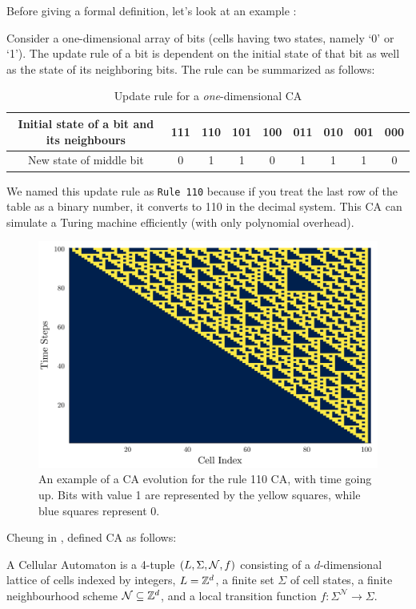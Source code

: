 \documentclass[11pt, oneside, listof=totoc]{scrbook}
\begin{document}
Before giving a formal definition, let's look at an example \cite{Farrelly2019}:
\begin{example}
    \label{eg:rule110}
    Consider a one-dimensional array of bits (\ie cells having two states, namely `0' or `1'). The update rule of a bit is dependent on the initial state of that bit as well as the state of its neighboring bits. The rule can be summarized as follows:
    \begin{table}[H]
        \centering
        \begin{tabular}{ | c | c | c | c | c | c | c | c | c | }
            \hline
            Initial state of a bit and its neighbours & 111 & 110 & 101 & 100 & 011 & 010 & 001 & 000 \\
            \hline
            New state of middle bit                   & 0   & 1   & 1   & 0   & 1   & 1   & 1   & 0   \\
            \hline
        \end{tabular}
        \caption{Update rule for a \textit{one}-dimensional CA}
        \label{tab:rule110}
    \end{table}
    We named this update rule as \verb|Rule 110| because if you treat the last row of the table as a binary number, it converts to 110 in the decimal system. This CA can simulate a Turing machine efficiently (with only polynomial overhead).
    \begin{figure}[H]
        \centering
        \includegraphics[width = \textwidth]{rule110_cellular_automaton.png}
        \caption{An example of a CA evolution for the rule 110 CA, with time going up. Bits with value 1 are
            represented by the yellow squares, while blue squares represent 0.}
        \label{fig:rule110}
    \end{figure} \noindent

\end{example}
Cheung in \cite{Cheung2007}, defined CA as follows:
\begin{definition}
    A Cellular Automaton is a 4-tuple \(\qty(L, \Sigma, \mathcal{N}, f)\) consisting of a $d$-dimensional lattice of cells indexed by integers, $L = \mathbb Z^d$, a finite set $\Sigma$ of cell states, a finite neighbourhood scheme $\mathcal{N} \subseteq \mathbb Z^d$, and a local transition function $f: \Sigma^{\mathcal{N}} \to \Sigma$.
\end{definition}
\end{document}
